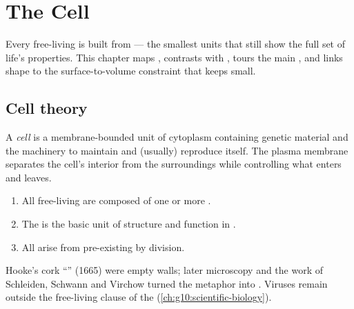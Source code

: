 \chapter{The Cell}\label{ch:g10:the-cell}

Every free-living  is built from  --- the smallest units
that still show the full set of life's properties. This chapter maps
, contrasts  with , tours the main
, and links shape to the surface-to-volume constraint that
keeps  small.

\section{Cell theory}

\begin{definition}[Cell]\label{def:g10:the-cell:cell}
A \emph{cell} is a membrane-bounded unit of cytoplasm
containing genetic material and the machinery to maintain and (usually)
reproduce itself. The plasma membrane separates the cell's interior
from the surroundings while controlling what enters and leaves.
\end{definition}

\begin{proposition}\label{prop:g10:the-cell:cell-theory}
\begin{enumerate}
  \item All free-living  are composed of one or more .
  \item The  is the basic unit of structure and function in
        .
  \item All  arise from pre-existing  by division.
\end{enumerate}
\end{proposition}
\admitted

\begin{remark}\label{rem:g10:the-cell:history}
Hooke's cork ``'' (1665) were empty walls; later microscopy and
the work of Schleiden, Schwann and Virchow turned the metaphor into
. Viruses remain outside the free-living clause of the 
(\cref{ch:g10:scientific-biology}).
\end{remark}

